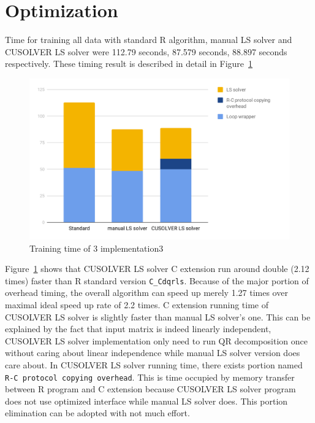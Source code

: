\documentclass[English]{dicomopapers}
\begin{document}
\section{Optimization}
Time for training all data with standard R algorithm, manual LS solver and CUSOLVER LS solver were 112.79 seconds, 87.579 seconds, 88.897 seconds respectively. These timing result is described in detail in Figure~\ref{fig:qr_ret}\newline

\begin{figure}[ht]
  \vspace*{-1.5cm}
  \centering
  \includegraphics[width=\columnwidth,natwidth=1200,natheight=742]{qr_ret.png}
  \caption{Training time of 3 implementation3}\label{fig:qr_ret}
\end{figure}
Figure~\ref{fig:qr_ret} shows that CUSOLVER LS solver C extension run around double (2.12 times) faster than R standard version \texttt{C\_Cdqrls}. Because of the major portion of overhead timing, the overall algorithm can speed up merely 1.27 times over maximal ideal speed up rate of 2.2 times. C extension running time of CUSOLVER LS solver is slightly faster than manual LS solver's one. This can be explained by the fact that input matrix is indeed linearly independent, CUSOLVER LS solver implementation only need to run QR decomposition once without caring about linear independence while manual LS solver version does care about. In CUSOLVER LS solver running time, there exists portion named \texttt{R-C protocol copying overhead}. This is time occupied by memory transfer between R program and C extension because CUSOLVER LS solver program does not use optimized interface while manual LS solver does. This portion elimination can be adopted with not much effort.\newline
\end{document}
